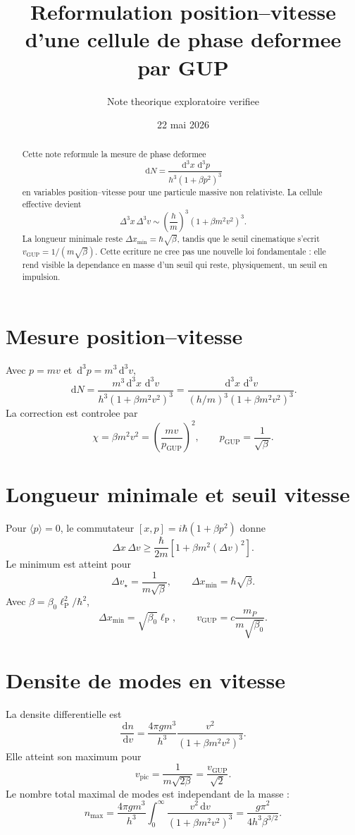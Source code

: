\documentclass[11pt,a4paper]{article}
\title{Reformulation position--vitesse d'une cellule de phase deformee par GUP}
\author{Note theorique exploratoire verifiee}
\date{22 mai 2026}
\newcommand{\dd}{\,\mathrm{d}}
\newcommand{\lp}{\ell_{\mathrm P}}
\newcommand{\vGUP}{v_{\mathrm{GUP}}}
\newcommand{\pGUP}{p_{\mathrm{GUP}}}
\begin{document}
\maketitle

\begin{abstract}
Cette note reformule la mesure de phase deformee
\[
\dd N=\frac{\dd^3x\,\dd^3p}{h^3(1+\beta p^2)^3}
\]
en variables position--vitesse pour une particule massive non relativiste. La cellule effective devient
\[
\Delta^3x\,\Delta^3v\sim
\left(\frac{h}{m}\right)^3(1+\beta m^2v^2)^3.
\]
La longueur minimale reste $\Delta x_{\min}=\hbar\sqrt{\beta}$, tandis que le seuil cinematique s'ecrit $\vGUP=1/(m\sqrt{\beta})$. Cette ecriture ne cree pas une nouvelle loi fondamentale : elle rend visible la dependance en masse d'un seuil qui reste, physiquement, un seuil en impulsion.
\end{abstract}

\section{Mesure position--vitesse}

Avec $p=mv$ et $\dd^3p=m^3\dd^3v$,
\[
\dd N=
\frac{m^3\dd^3x\,\dd^3v}{h^3(1+\beta m^2v^2)^3}
=
\frac{\dd^3x\,\dd^3v}{(h/m)^3(1+\beta m^2v^2)^3}.
\]
La correction est controlee par
\[
\chi=\beta m^2v^2=\left(\frac{mv}{\pGUP}\right)^2,
\qquad
\pGUP=\frac{1}{\sqrt{\beta}}.
\]

\section{Longueur minimale et seuil vitesse}

Pour $\langle p\rangle=0$, le commutateur $[x,p]=i\hbar(1+\beta p^2)$ donne
\[
\Delta x\,\Delta v
\geq
\frac{\hbar}{2m}\left[1+\beta m^2(\Delta v)^2\right].
\]
Le minimum est atteint pour
\[
\Delta v_\star=\frac{1}{m\sqrt{\beta}},
\qquad
\Delta x_{\min}=\hbar\sqrt{\beta}.
\]
Avec $\beta=\beta_0\lp^2/\hbar^2$,
\[
\Delta x_{\min}=\sqrt{\beta_0}\lp,
\qquad
\vGUP=c\frac{m_P}{m\sqrt{\beta_0}}.
\]

\section{Densite de modes en vitesse}

La densite differentielle est
\[
\frac{\dd n}{\dd v}
=
\frac{4\pi g m^3}{h^3}
\frac{v^2}{(1+\beta m^2v^2)^3}.
\]
Elle atteint son maximum pour
\[
v_{\mathrm{pic}}=\frac{1}{m\sqrt{2\beta}}=\frac{\vGUP}{\sqrt{2}}.
\]
Le nombre total maximal de modes est independant de la masse :
\[
n_{\max}=
\frac{4\pi g m^3}{h^3}
\int_0^\infty
\frac{v^2\dd v}{(1+\beta m^2v^2)^3}
=
\frac{g\pi^2}{4h^3\beta^{3/2}}.
\]
\end{document}
